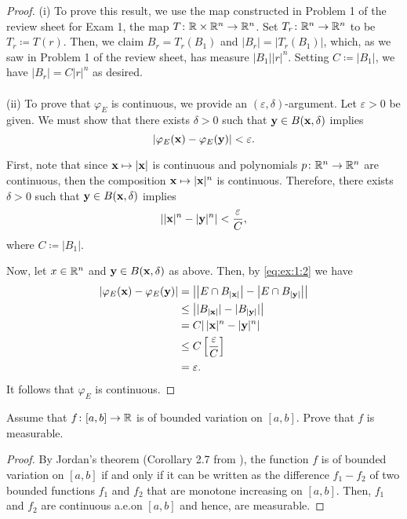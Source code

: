 \begin{proof}
(i) To prove this result, we use the map constructed in Problem 1 of the
review sheet for Exam 1, the map $T\colon\mathbb{R}\times\mathbb{R}^n\to\mathbb{R}^n$. Set
$T_r\colon\mathbb{R}^n\to\mathbb{R}^n$ to be $T_r\coloneqq T(r)$. Then, we claim
$B_r=T_r(B_1)$ and $|B_r|=|T_r(B_1)|$, which, as we saw in Problem 1 of the
review sheet, has measure $|B_1||r|^n$. Setting $C\coloneqq |B_1|$, we have
$|B_r|=C|r|^n$ as desired.
\\\\
(ii) To prove that $\varphi_E$ is continuous, we provide an
$(\varepsilon,\delta)$-argument. Let $\varepsilon>0$ be given. We must show
that there exists $\delta>0$ such that $\mathbf{y}\in B(\mathbf{x},\delta)$ implies
\begin{equation}
\label{eq:ex:1:1}
\left|\varphi_E(\mathbf{x})-\varphi_E(\mathbf{y})\right|<\varepsilon.
\end{equation}

First, note that since $\mathbf{x}\mapsto |\mathbf{x}|$ is continuous and polynomials
$p\colon\mathbb{R}^n\to\mathbb{R}^n$ are continuous, then the composition
$\mathbf{x}\mapsto|\mathbf{x}|^n$ is continuous. Therefore, there exists $\delta>0$
such that $\mathbf{y}\in B(\mathbf{x},\delta)$ implies
\begin{equation}
\label{eq:ex:1:2}
\left||\mathbf{x}|^n-|\mathbf{y}|^n\right|<\frac{\varepsilon}{C},
\end{equation}
where $C\coloneqq |B_1|$.

Now, let $x\in\mathbb{R}^n$ and $\mathbf{y}\in B(\mathbf{x},\delta)$ as above. Then, by
\eqref{eq:ex:1:2} we have
\begin{equation}
\label{eq:ex:1:3}
\begin{aligned}
\left|\varphi_E(\mathbf{x})-\varphi_E(\mathbf{y})\right|
&=\left|
\left|E\cap B_{|\mathbf{x}|}\right|
-
\left|E\cap B_{|\mathbf{y}|}\right|
\right|\\
&\leq\left| |B_{|\mathbf{x}|}|-|B_{|\mathbf{y}|}|\right|\\
&=C|\left|\mathbf{x}|^n-|\mathbf{y}|^n\right|\\
&\leq C\left[\frac{\varepsilon}{C}\right]\\
&=\varepsilon.
\end{aligned}
\end{equation}
It follows that $\varphi_E$ is continuous.
\end{proof}

\begin{problem}
Assume that $f\colon[a,b]\to\mathbb{R}$ is of bounded variation on $[a,b]$. Prove
that $f$ is measurable.
\end{problem}
\begin{proof}
By Jordan's theorem (Corollary 2.7 from \cite[Ch.\@ 2, p.\@
21]{wheeden-zygmund}), the function $f$ is of bounded variation on $[a,b]$
if and only if it can be written as the difference $f_1-f_2$ of two bounded
functions $f_1$ and $f_2$ that are monotone increasing on $[a,b]$. Then,
$f_1$ and $f_2$ are continuous a.e.\@ on $[a,b]$ and hence, are
measurable.
\end{proof}

